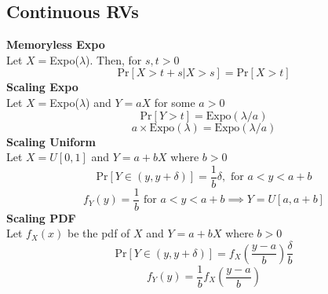 \documentclass{article}
\newcommand{\x}[1]{\textrm{#1}}
\newcommand{\pr}[1]{\textrm{Pr}[#1]}
\newcommand{\xs}[1]{\textrm{ #1 }}
\newcommand{\eq}[1]{\begin{equation}#1\end{equation}}
\newcommand{\eqs}[1]{\begin{mdframed}#1\end{mdframed}}
\begin{document}
\subsection*{Continuous RVs}
\eqs{
\textbf{Memoryless Expo}\\
Let $X = $Expo($\lambda$). Then, for $s,t > 0$
\eq{\pr{X > t +s | X > s} = \pr{X > t}}
\textbf{Scaling Expo}\\
Let $X = $Expo($\lambda$) and $Y = aX$ for some $a > 0$
\eq{\pr{Y > t} = \x{Expo}(\lambda/a)}
\eq{a\times \x{Expo}(\lambda) = \x{Expo}(\lambda /a)}
\textbf{Scaling Uniform}\\
Let $X = U[0,1]$ and $Y = a+bX$ where $b > 0$
\eq{\pr{Y \in (y,y +\delta)}=\frac{1}{b}{\delta}, \xs{for} a < y < a+b}
\eq{f_Y (y) = \frac{1}{b} \xs{for} a < y < a+b \implies Y = U[a,a+b]}
\textbf{Scaling PDF}\\
 Let $f_X (x)$ be the pdf of $X$ and $Y = a+bX$ where $b > 0$
\eq{\pr{Y \in (y,y +\delta)}=f_X (\frac{y-a}{b})\frac{\delta}{b}}
\eq{f_Y (y) =\frac{1}{b}f_X (\frac{y-a}{b})}
}
\end{document}

